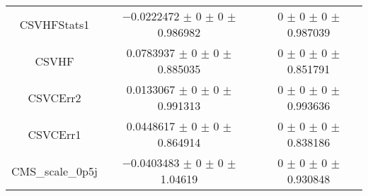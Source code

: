 \begin{table}
\begin{tabular}{ccc}
CSVHFStats1 & \num{-0.0222472} $\pm$ \num{0} $\pm$ \num{0} $\pm$ \num{0.986982} & \num{0} $\pm$ \num{0} $\pm$ \num{0} $\pm$ \num{0.987039}\\
CSVHF & \num{0.0783937} $\pm$ \num{0} $\pm$ \num{0} $\pm$ \num{0.885035} & \num{0} $\pm$ \num{0} $\pm$ \num{0} $\pm$ \num{0.851791}\\
CSVCErr2 & \num{0.0133067} $\pm$ \num{0} $\pm$ \num{0} $\pm$ \num{0.991313} & \num{0} $\pm$ \num{0} $\pm$ \num{0} $\pm$ \num{0.993636}\\
CSVCErr1 & \num{0.0448617} $\pm$ \num{0} $\pm$ \num{0} $\pm$ \num{0.864914} & \num{0} $\pm$ \num{0} $\pm$ \num{0} $\pm$ \num{0.838186}\\
CMS\_scale\_0p5j & \num{-0.0403483} $\pm$ \num{0} $\pm$ \num{0} $\pm$ \num{1.04619} & \num{0} $\pm$ \num{0} $\pm$ \num{0} $\pm$ \num{0.930848}\\
\bottomrule
\end{tabular}
\end{table}